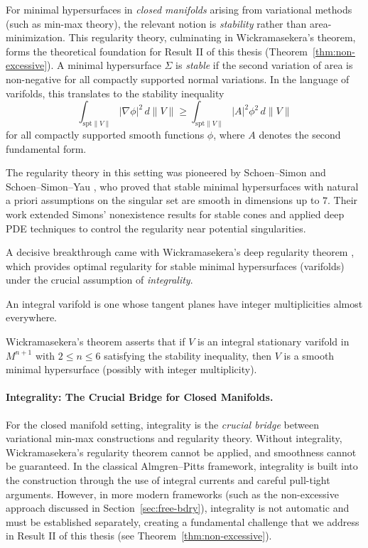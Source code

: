 For minimal hypersurfaces in \emph{closed manifolds} arising from variational methods (such as
min-max theory), the relevant notion is \emph{stability} rather than area-minimization. This
regularity theory, culminating in Wickramasekera's theorem, forms the theoretical foundation for
Result II of this thesis (Theorem~\ref{thm:non-excessive}). A minimal hypersurface $\Sigma$ is
\emph{stable} if the second variation of area is non-negative for all compactly supported normal
variations. In the language of varifolds, this translates to the stability inequality
\[
    \int_{\text{spt}\|V\|} |\nabla \phi|^2 \, d\|V\|
    \geq \int_{\text{spt}\|V\|} |A|^2 \phi^2 \, d\|V\|
\]
for all compactly supported smooth functions $\phi$, where $A$ denotes the second fundamental form.

The regularity theory in this setting was pioneered by Schoen--Simon \cite{SS81} and
Schoen--Simon--Yau \cite{SSY75}, who proved that stable minimal hypersurfaces with natural a priori
assumptions on the singular set are smooth in dimensions up to $7$. Their work extended Simons'
nonexistence results for stable cones and applied deep PDE techniques to control the regularity
near potential singularities.

A decisive breakthrough came with Wickramasekera's deep regularity theorem \cite{Wic14}, which
provides optimal regularity for stable minimal hypersurfaces (varifolds) under the crucial
assumption of \emph{integrality}.

\begin{definition}
An integral varifold is one whose tangent planes have integer multiplicities almost everywhere.
\end{definition}

Wickramasekera's theorem asserts that if $V$ is an integral stationary varifold in $M^{n+1}$ with
$2 \leq n \leq 6$ satisfying the stability inequality, then $V$ is a smooth minimal hypersurface
(possibly with integer multiplicity).

\paragraph{Integrality: The Crucial Bridge for Closed Manifolds.}
For the closed manifold setting, integrality is the \emph{crucial bridge} between variational
min-max constructions and regularity theory. Without integrality, Wickramasekera's regularity
theorem cannot be applied, and smoothness cannot be guaranteed. In the classical Almgren--Pitts
framework, integrality is built into the construction through the use of integral currents and
careful pull-tight arguments. However, in more modern frameworks (such as the non-excessive approach
discussed in Section~\ref{sec:free-bdry}), integrality is not automatic and must be established
separately, creating a fundamental challenge that we address in Result II of this thesis (see
Theorem~\ref{thm:non-excessive}).

